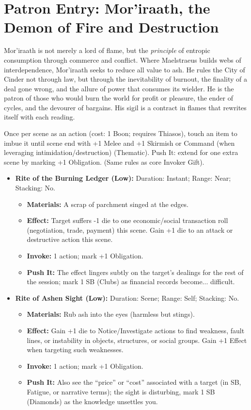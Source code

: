 \section{Patron Entry: Mor'iraath, the Demon of Fire and Destruction}

 Mor'iraath is not merely a lord of flame, but the \textit{principle} of entropic consumption through commerce and conflict. Where Maelstraeus builds webs of interdependence, Mor'iraath seeks to reduce all value to ash. He rules the City of Cinder not through law, but through the inevitability of burnout, the finality of a deal gone wrong, and the allure of power that consumes its wielder. He is the patron of those who would burn the world for profit or pleasure, the ender of cycles, and the devourer of bargains. His sigil is a contract in flames that rewrites itself with each reading.

 Once per scene as an action (cost: 1 Boon; requires Thiasos), touch an item to imbue it until scene end with +1 Melee and +1 Skirmish or Command (when leveraging intimidation/destruction) (Thematic). Push It: extend for one extra scene by marking +1 Obligation. (Same rules as core Invoker Gift).

\begin{itemize}[leftmargin=*]
    \item \textbf{Rite of the Burning Ledger (Low):} Duration: Instant; Range: Near; Stacking: No.
    \begin{itemize}
        \item \textbf{Materials:} A scrap of parchment singed at the edges.
        \item \textbf{Effect:} Target suffers -1 die to one economic/social transaction roll (negotiation, trade, payment) this scene. Gain +1 die to an attack or destructive action this scene.
        \item \textbf{Invoke:} 1 action; mark +1 Obligation.
        \item \textbf{Push It:} The effect lingers subtly on the target's dealings for the rest of the session; mark 1 SB (Clubs) as financial records become... difficult.
    \end{itemize}
    \item \textbf{Rite of Ashen Sight (Low):} Duration: Scene; Range: Self; Stacking: No.
    \begin{itemize}
        \item \textbf{Materials:} Rub ash into the eyes (harmless but stings).
        \item \textbf{Effect:} Gain +1 die to Notice/Investigate actions to find weakness, fault lines, or instability in objects, structures, or social groups. Gain +1 Effect when targeting such weaknesses.
        \item \textbf{Invoke:} 1 action; mark +1 Obligation.
        \item \textbf{Push It:} Also see the ``price'' or ``cost'' associated with a target (in SB, Fatigue, or narrative terms); the sight is disturbing, mark 1 SB (Diamonds) as the knowledge unsettles you.
    \end{itemize}
\end{itemize}

